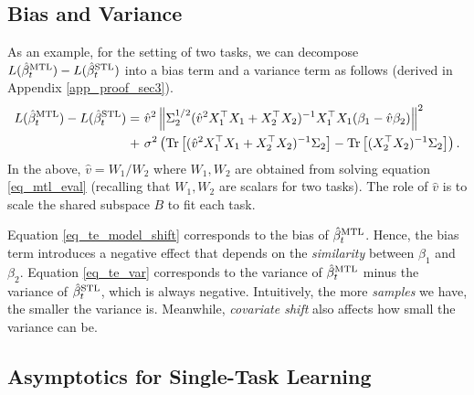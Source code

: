 \subsection{Bias and Variance}

As an example, for the setting of two tasks, we can decompose $L(\hat{\beta}_t^{\text{MTL}}) - L(\hat{\beta}_t^{\text{STL}})$ into a bias term and a variance term as follows (derived in Appendix \ref{app_proof_sec3}).
{\small\begin{align}
	L(\hat{\beta}_t^{\text{MTL}}) - L(\hat{\beta}_t^{\text{STL}}) =& ~ \hat{v}^2 \left\| \Sigma_2^{1/2} (\hat{v}^2 X_1^{\top}X_1 + X_2^{\top}X_2)^{-1}X_1^{\top}X_1 (\beta_1 - \hat{v}\beta_2) \right\|^2 \label{eq_te_model_shift} \\
	+&~ \sigma^2 \left({\operatorname{Tr}\left[(\hat{v}^2 X_1^{\top}X_1 + X_2^{\top}X_2)^{-1}\Sigma_2\right] - \operatorname{Tr}\left[(X_2^{\top}X_2)^{-1}\Sigma_2\right]}\right). \label{eq_te_var}
\end{align}}%
In the above, $\hat{v} = W_1 / W_2$ where $W_1, W_2$ are obtained from solving equation \eqref{eq_mtl_eval} (recalling that $W_1, W_2$ are scalars for two tasks).
The role of $\hat{v}$ is to scale the shared subspace $B$ to fit each task.

Equation \eqref{eq_te_model_shift} corresponds to the bias of $\hat{\beta}_t^{\text{MTL}}$.
Hence, the bias term introduces a negative effect that depends on the \textit{similarity} between $\beta_1$ and $\beta_2$.
Equation \eqref{eq_te_var} corresponds to the variance of $\hat{\beta}_t^{\text{MTL}}$ minus the variance of $\hat{\beta}_t^{\text{STL}}$, which is always negative.
Intuitively, the more \textit{samples} we have, the smaller the variance is.
Meanwhile, \textit{covariate shift} also affects how small the variance can be.

\subsection{Asymptotics for Single-Task Learning}

